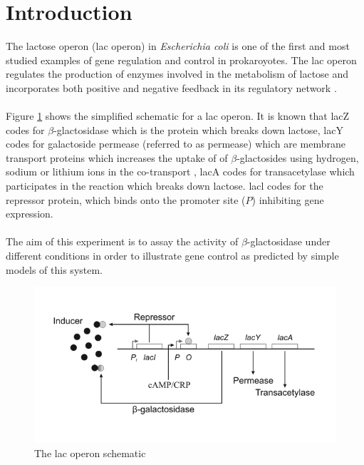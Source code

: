 \documentclass{article}
\begin{document}
\section{Introduction}
The lactose operon (lac operon) in \textit{Escherichia coli} is one of the first and most studied examples of gene regulation and control in prokaroyotes. The lac operon regulates the production of enzymes involved in the metabolism of lactose and incorporates both positive and negative feedback in its regulatory network \cite{goossens93}. \\ \\
Figure \ref{fig:lac_operon} shows the simplified schematic for a lac operon. It is known that lacZ codes for $\beta$-glactosidase which is the protein which breaks down lactose, lacY codes for galactoside permease (referred to as permease) which are membrane transport proteins which increases the uptake of of $\beta$-glactosides using hydrogen, sodium or lithium ions in the co-transport \cite{permease}, lacA codes for transacetylase which participates in the reaction which breaks down lactose. lacl codes for the repressor protein, which binds onto the promoter site ($P$) inhibiting gene expression. \\ \\
The aim of this experiment is to assay the activity of $\beta$-glactosidase under different conditions in order to illustrate gene control as predicted by simple models of this system.
\begin{figure}[htp]
	\centering
	\includegraphics[width=0.8\linewidth]{lac.png}
	\caption{The lac operon schematic}
	\label{fig:lac_operon}
\end{figure}
\end{document}

